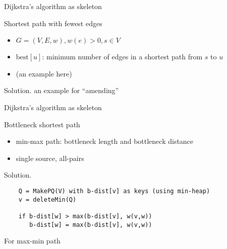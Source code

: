 \begin{frame}{Dijkstra's algorithm as skeleton}
  \begin{exampleblock}{Shortest path with fewest edges }
    \begin{itemize}
      \item $G = (V, E, w), w(e) > 0, s \in V$
      \item $\text{best}[u]$: minimum number of edges in a shortest path from $s$ to $u$
      \item (an example here)
    \end{itemize}
  \end{exampleblock}

  \begin{block}{Solution.}
    an example for ``amending''
  \end{block}
\end{frame}
\begin{frame}[fragile]{Dijkstra's algorithm as skeleton}
  \begin{exampleblock}{Bottleneck shortest path }
    \begin{itemize}
      \item min-max path: bottleneck length and bottleneck distance
      \item single source, all-pairs
    \end{itemize}
  \end{exampleblock}

  \begin{block}{Solution.}
    \begin{verbatim}
    Q = MakePQ(V) with b-dist[v] as keys (using min-heap)
    v = deleteMin(Q)

    if b-dist[w] > max(b-dist[v], w(v,w))
       b-dist[w] = max(b-dist[v], w(v,w))
    \end{verbatim}
  \end{block}

  \begin{alertblock}{For max-min path }

  \end{alertblock}
\end{frame}
